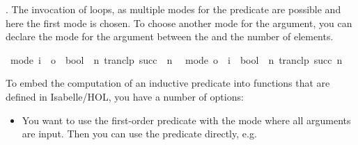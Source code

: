 \begin{isabellebody}
\begin{isamarkuptext}
  .  The invocation of \hyperlink{command.values}{\mbox{}}
   loops, as multiple modes for the
  predicate  are possible and here the first mode  is chosen. To choose another mode for the argument,
  you can declare the mode for the argument between the \hyperlink{command.values}{\mbox{}} and the number of elements.%
\end{isamarkuptext}%
\isamarkuptrue%
%
\isadelimquote
%
\endisadelimquote
%
\isatagquote
{}\isamarkupfalse%
\ {}mode{}\ i\ {}\ o\ {}\ bool{}\ {}\ {}{}n{}\ tranclp\ succ\ {}{}\ n{}{}\ \isanewline
{}\isamarkupfalse%
\ {}mode{}\ o\ {}\ i\ {}\ bool{}\ {}\ {}{}n{}\ tranclp\ succ\ n\ {}{}{}{}%
\endisatagquote
{\isafoldquote}%
%
\isadelimquote
%
\endisadelimquote
%
\isamarkuptrue%
%
\begin{isamarkuptext}%
To embed the computation of an inductive predicate into functions
  that are defined in Isabelle/HOL, you have a number of options:

  \begin{itemize}

    \item You want to use the first-order predicate with the mode
      where all arguments are input. Then you can use the predicate directly, e.g.


\end{itemize}
\end{isamarkuptext}
\end{isabellebody}
